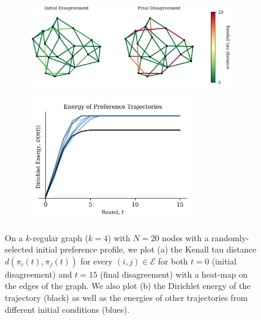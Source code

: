 \documentclass[conference]{ieeeconf}
\newcommand{\E}{\mathcal{E}}
\begin{document}
\begin{figure}[h]
    \begin{subfigure}[b]{0.6\textwidth}
    \includegraphics[width=\textwidth]{figs/fig2alt.png}
    \caption{}
    \label{fig:2a}
    \end{subfigure}
    \hfill
    \begin{subfigure}[b]{0.4\textwidth}
    \centering
    \includegraphics[width=0.8\textwidth]{figs/fig2balt.png}
    \caption{}
    \label{fig:2b}
    \end{subfigure}
    \caption{On a $k$-regular graph ($k=4$) with $N =20$ nodes with a randomly-selected initial preference profile, we plot (a) the Kenall tau distance $d(\pi_i(t),\pi_j(t))$ for every $(i,j) \in \E$ for both $t=0$ (initial disagreement) and $t=15$ (final disagreement) with a heat-map on the edges of the graph. We also plot (b) the Dirichlet energy of the trajectory (black) as well as the energies of other trajectories from different initial conditions (blues).}
    \label{fig:2}
    \vspace{-1em}
\end{figure}


\vspace{-1em}


\end{document}
